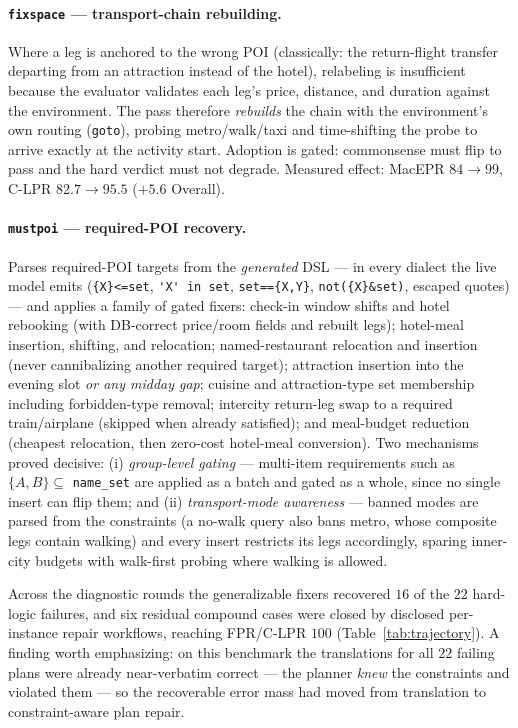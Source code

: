 \documentclass[11pt,a4paper]{article}
\begin{document}
\paragraph{\texttt{fixspace} --- transport-chain rebuilding.}
Where a leg is anchored to the wrong POI (classically: the return-flight
transfer departing from an attraction instead of the hotel), relabeling is
insufficient because the evaluator validates each leg's price, distance, and
duration against the environment. The pass therefore \emph{rebuilds} the chain
with the environment's own routing (\texttt{goto}), probing
metro/walk/taxi and time-shifting the probe to arrive exactly at the activity
start. Adoption is gated: commonsense must flip to pass and the hard verdict
must not degrade. Measured effect: MacEPR $84\!\to\!99$,
C-LPR $82.7\!\to\!95.5$ ($+5.6$ Overall).

\paragraph{\texttt{mustpoi} --- required-POI recovery.}
Parses required-POI targets from the \emph{generated} DSL --- in every dialect
the live model emits (\lstinline|{X}<=set|, \lstinline|'X' in set|,
\lstinline|set=={X,Y}|, \lstinline|not({X}&set)|, escaped quotes) --- and
applies a family of gated fixers: check-in window shifts and hotel rebooking
(with DB-correct price/room fields and rebuilt legs); hotel-meal insertion,
shifting, and relocation; named-restaurant relocation and insertion (never
cannibalizing another required target); attraction insertion into the evening
slot \emph{or any midday gap}; cuisine and attraction-type set membership
including forbidden-type removal; intercity return-leg swap to a required
train/airplane (skipped when already satisfied); and meal-budget reduction
(cheapest relocation, then zero-cost hotel-meal conversion). Two mechanisms
proved decisive: (i) \emph{group-level gating} --- multi-item requirements
such as $\{A,B\}\subseteq$ \texttt{name\_set} are applied as a batch and gated
as a whole, since no single insert can flip them; and (ii)
\emph{transport-mode awareness} --- banned modes are parsed from the
constraints (a no-walk query also bans metro, whose composite legs contain
walking) and every insert restricts its legs accordingly, sparing inner-city
budgets with walk-first probing where walking is allowed.

Across the diagnostic rounds the generalizable fixers recovered $16$ of the
$22$ hard-logic failures, and six residual compound cases were closed by
disclosed per-instance repair workflows, reaching FPR/C-LPR $100$
(Table~\ref{tab:trajectory}). A finding worth emphasizing: on this
benchmark the translations for all $22$ failing plans were already
near-verbatim correct --- the planner \emph{knew} the constraints and violated
them --- so the recoverable error mass had moved from translation to
constraint-aware plan repair.
\end{document}
